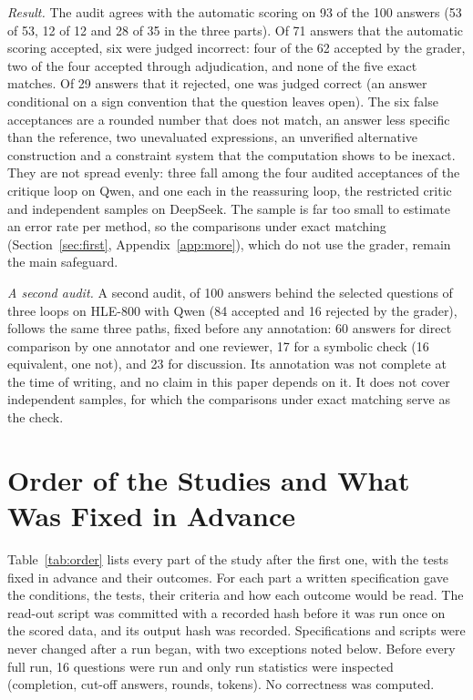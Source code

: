 \documentclass[11pt]{article}
\newcommand{\ds}{DeepSeek}
\newcommand{\qw}{Qwen}
\begin{document}
\emph{Result.}
The audit agrees with the automatic scoring on 93 of the 100 answers (53 of 53, 12 of 12 and 28 of 35 in the three parts).
Of 71 answers that the automatic scoring accepted, six were judged incorrect: four of the 62 accepted by the grader, two of the four accepted through adjudication, and none of the five exact matches.
Of 29 answers that it rejected, one was judged correct (an answer conditional on a sign convention that the question leaves open).
The six false acceptances are a rounded number that does not match, an answer less specific than the reference, two unevaluated expressions, an unverified alternative construction and a constraint system that the computation shows to be inexact.
They are not spread evenly: three fall among the four audited acceptances of the critique loop on \qw, and one each in the reassuring loop, the restricted critic and independent samples on \ds.
The sample is far too small to estimate an error rate per method, so the comparisons under exact matching (Section~\ref{sec:first}, Appendix~\ref{app:more}), which do not use the grader, remain the main safeguard.

\emph{A second audit.}
A second audit, of 100 answers behind the selected questions of three loops on HLE-800 with \qw{} (84 accepted and 16 rejected by the grader), follows the same three paths, fixed before any annotation: 60 answers for direct comparison by one annotator and one reviewer, 17 for a symbolic check (16 equivalent, one not), and 23 for discussion. Its annotation was not complete at the time of writing, and no claim in this paper depends on it. It does not cover independent samples, for which the comparisons under exact matching serve as the check.

\section{Order of the Studies and What Was Fixed in Advance}
\label{app:order}

Table~\ref{tab:order} lists every part of the study after the first one, with the tests fixed in advance and their outcomes.
For each part a written specification gave the conditions, the tests, their criteria and how each outcome would be read. The read-out script was committed with a recorded hash before it was run once on the scored data, and its output hash was recorded.
Specifications and scripts were never changed after a run began, with two exceptions noted below.
Before every full run, 16 questions were run and only run statistics were inspected (completion, cut-off answers, rounds, tokens). No correctness was computed.
\end{document}

